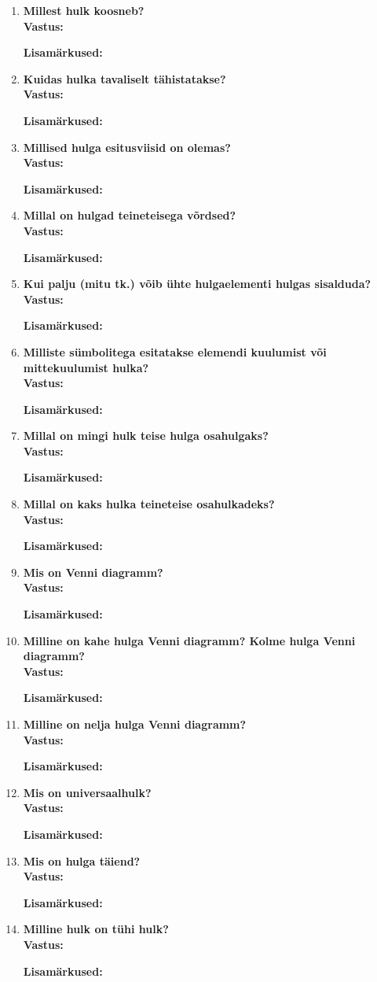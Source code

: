 \documentclass[a4paper,12pt]{article}
\makeatletter
\newenvironment{question}[1]{%
  \item \textbf{#1} \vspace{0.5em} \\ %
  \textbf{Vastus:} \vspace{0.25em} \\ %
  \def\@lisamarkused{} %
}{%
  \if\relax\detokenize\expandafter{\@lisamarkused}\relax %
  \else
    \vspace{0.5em} %
    \textbf{Lisamärkused:} \\ %
    \@lisamarkused %
  \fi
  \vspace{1em} %
}
\makeatother
\begin{document}
\begin{enumerate}[left=0pt]
\begin{question}{Millest hulk koosneb?}
\end{question}

\begin{question}{Kuidas hulka tavaliselt tähistatakse?}
\end{question}

\begin{question}{Millised hulga esitusviisid on olemas?}
\end{question}

\begin{question}{Millal on hulgad teineteisega võrdsed?}
\end{question}

\begin{question}{Kui palju (mitu tk.) võib ühte hulgaelementi hulgas sisalduda?}
\end{question}

\begin{question}{Milliste sümbolitega esitatakse elemendi kuulumist või mittekuulumist hulka?}
\end{question}

\begin{question}{Millal on mingi hulk teise hulga osahulgaks?}
\end{question}

\begin{question}{Millal on kaks hulka teineteise osahulkadeks?}
\end{question}

\begin{question}{Mis on Venni diagramm?}
\end{question}

\begin{question}{Milline on kahe hulga Venni diagramm? Kolme hulga Venni diagramm?}
\end{question}

\begin{question}{Milline on nelja hulga Venni diagramm?}
\end{question}

\begin{question}{Mis on universaalhulk?}
\end{question}

\begin{question}{Mis on hulga täiend?}
\end{question}

\begin{question}{Milline hulk on tühi hulk?}
\end{question}


\end{enumerate}
\end{document}
